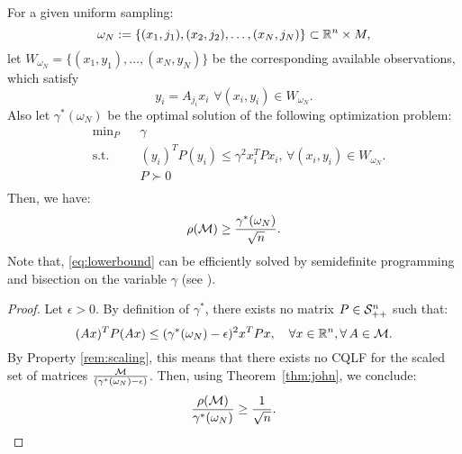 \begin{theorem}\label{thm:lowerbound}
For a given uniform sampling: $$\omega_N := \{(x_1, j_1), (x_2, j_2), \ldots, (x_N, j_N)\} \subset \mathbb{R}^n \times M,$$ let $W_{\omega_N}=\{(x_1,y_1), \ldots,(x_N,y_N)\}$ be the corresponding available observations, which satisfy $$y_i= A_{j_i}x_i\,\, \forall (x_i, y_i) \in W_{\omega_N}.$$
Also let $\gamma^*(\omega_N)$ be the optimal solution of the following optimization problem:
\begin{equation}\label{eq:lowerbound}
\begin{aligned}
& \text{min}_P & & \gamma \\
& \text{s.t.} 
&  & (y_i)^T P (y_i) \leq \gamma^2 x_i^TPx_i,\,  \forall (x_i, y_i) \in W_{\omega_N}.\\
& && P \succ 0 \\
\end{aligned}
\end{equation}
Then, we have:
$$\rho(\mathcal{M}) \geq \frac{\gamma^*(\omega_N)}{\sqrt{n}}.$$ Note that, \eqref{eq:lowerbound} can be efficiently solved by semidefinite programming and bisection on the variable $\gamma$ (see \cite{boyd}).
\end{theorem}
\begin{proof}
Let $\epsilon >0$. By definition of $\gamma^*$,  there exists no matrix $P \in \mathcal{S}^n_{++}$ such that:
\begin{equation*}(Ax)^T P (Ax) \leq (\gamma^*(\omega_N) -\epsilon)^2x^TPx,\quad \forall x \in \mathbb{R}^n, \forall\, A \in \mathcal{M}.
\end{equation*}
By Property \ref{rem:scaling}, this means that there exists no CQLF for the scaled set of matrices $\frac{\mathcal{M}}{(\gamma^*(\omega_N)-\epsilon)}$. Then, using Theorem~\ref{thm:john}, we conclude:
\begin{equation*}\frac{\rho(\mathcal{M})}{\gamma^*(\omega_N)} \geq \frac{1}{\sqrt{n}}.\end{equation*}
\end{proof}
